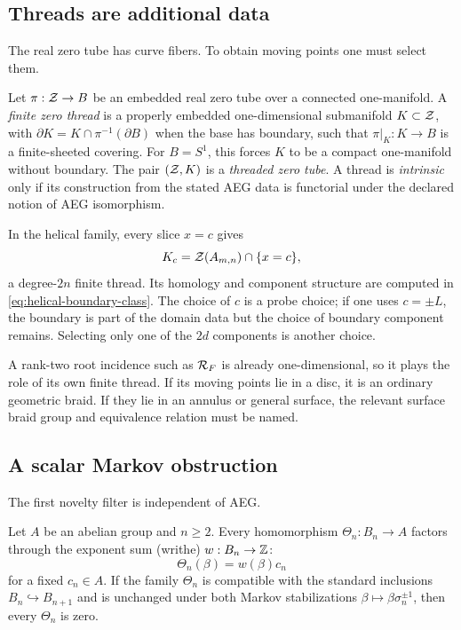 \subsection{Threads are additional data}

The real zero tube has curve fibers.  To obtain moving points one must select them.

\begin{definition}
\label{def:finite-zero-thread}
Let $\pi:\mathcal Z\to B$ be an embedded real zero tube over a connected
one-manifold.  A \emph{finite zero thread} is a properly embedded
one-dimensional submanifold $K\subset\mathcal Z$, with
$\partial K=K\cap\pi^{-1}(\partial B)$ when the base has boundary, such that
$\pi|_K:K\to B$ is a finite-sheeted covering.  For $B=S^1$, this forces $K$ to be
a compact one-manifold without boundary.  The pair $(\mathcal Z,K)$ is a
\emph{threaded zero tube}.  A thread is \emph{intrinsic} only if its construction
from the stated AEG data is functorial under the declared notion of AEG
isomorphism.
\end{definition}

In the helical family, every slice $x=c$ gives
\[
 K_c=\mathcal Z(A_{m,n})\cap\{x=c\},
\]
a degree-$2n$ finite thread.  Its homology and component structure are computed in
\eqref{eq:helical-boundary-class}.  The choice of $c$ is a probe choice; if one uses
$c=\pm L$, the boundary is part of the domain data but the choice of boundary
component remains.  Selecting only one of the $2d$ components is another choice.

A rank-two root incidence such as $\mathcal R_F$ is already one-dimensional, so it plays
the role of its own finite thread.  If its moving points lie in a disc, it is an
ordinary geometric braid.  If they lie in an annulus or general surface, the
relevant surface braid group and equivalence relation must be named.

\subsection{A scalar Markov obstruction}

The first novelty filter is independent of AEG.

\begin{proposition}
\label{prop:stateless-additive-collapse}
Let $A$ be an abelian group and $n\ge2$.  Every homomorphism
$\Theta_n:B_n\to A$ factors through the exponent sum (writhe)
$w:B_n\to\mathbb{Z}$:
\[
 \Theta_n(\beta)=w(\beta)c_n
\]
for a fixed $c_n\in A$.  If the family $\Theta_n$ is compatible with the standard
inclusions $B_n\hookrightarrow B_{n+1}$ and is unchanged under both Markov
stabilizations $\beta\mapsto\beta\sigma_n^{\pm1}$, then every $\Theta_n$ is zero.
\end{proposition}


